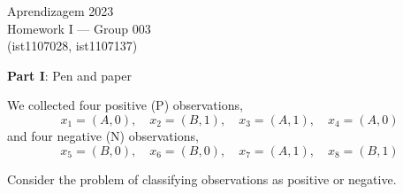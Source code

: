 \documentclass[12pt]{article}
\begin{document}
\begin{center}
Aprendizagem 2023\\
Homework I --- Group 003\\
(ist1107028, ist1107137)\vskip 1cm
\end{center}

\large{\textbf{Part I}: Pen and paper}\normalsize

\vspace{20pt}
\hspace{-20pt}We collected four positive (P) observations, 
\[
x_1 = (A,0), \quad x_2 = (B,1), \quad x_3 = (A,1), \quad x_4 = (A,0)
\]
and four negative (N) observations,
\[
x_5 = (B,0), \quad x_6 = (B,0), \quad x_7 = (A,1), \quad x_8 = (B,1)
\]


\hspace{-20pt}Consider the problem of classifying observations as positive or negative.
\end{document}
